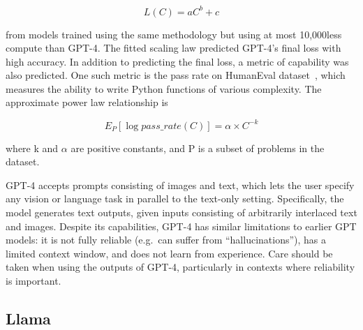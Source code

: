 \begin{equation}
	L(C) = aC^b + c
	\label{eq:gpt4-scaling-law}
\end{equation}

\noindent from models trained using the same methodology but using at most 10,000\texttimes less compute than GPT-4.
The fitted scaling law predicted GPT-4's final loss with high accuracy.
In addition to predicting the final loss, a metric of capability was also predicted.
One such metric is the pass rate on HumanEval dataset~\cite{chen2021evaluating}, which measures the ability to write Python functions of various complexity.
The approximate power law relationship is

\begin{equation}
	E_P [\log{pass\_rate(C)}] = \alpha \times C^{-k}
	\label{eq:gpt4-pass-rate}
\end{equation}

\noindent where k and \(\alpha\) are positive constants, and P is a subset of problems in the dataset.

GPT-4 accepts prompts consisting of images and text, which lets the user specify any vision or language task in parallel to the text-only setting.
Specifically, the model generates text outputs, given inputs consisting of arbitrarily interlaced text and images.
Despite its capabilities, GPT-4 has similar limitations to earlier GPT models: it is not fully reliable (e.g.\ can suffer from \enquote{hallucinations}), has a limited context window, and does not learn from experience.
Care should be taken when using the outputs of GPT-4, particularly in contexts where reliability is important.

\subsection{Llama}
\label{subsec:llama}

